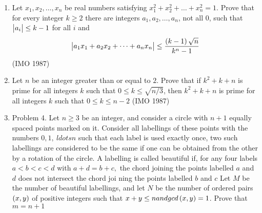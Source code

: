 \begin{enumerate}
\item Let $x_1, x_2, \dots, x_n$ be real numbers satisfying $x^2_1 +x^2_2 +\dots+x^2_n = 1$. Prove that for every integer $k\geq2$ there are integers $a_1, a_2, \dots , a_n$, not all $0$, such that $\begin{vmatrix}a_i\end{vmatrix}\leq k-1$ for all $i$ and 
                     \begin{align*} \begin{vmatrix}a_1x_1+a_2x_2+\dots+a_nx_n\end{vmatrix} \leq \frac{\left(k-1\right)\sqrt{n}}{k^n-1} \end{align*}\hfill(IMO 1987)
	 \item Let $n$ be an integer greater than or equal to $2$. Prove that if $k^2+k+n$ is prime for all integers $k$ such that $0\leq k\leq \sqrt{n/3}$, then $k^2+k+n$ is prime for all integers $k$ such that $0\leq k\leq n-2$ \hfill(IMO 1987)
 \item Problem 4. Let $n \geq  3$ be an integer, and consider a circle with $n+1$ equally spaced points marked on it. Consider all labellings of these points with the numbers $0,1,\    ldots n$ such that each label is used exactly once, two such labellings are considered to be the same if one can be obtained from the other by a rotation of the circle. A labelling     is called beautiful if, for any four labels $a< b<c < d$ with $a+d=b+c,$ the chord joining the points labelled $a$ and $d$ does not intersect the chord joi    ning the points labelled $b$ and $c$                                                                                                                                                                                                                                                                                                                                     Let $M$ be the number of beautiful labellings, and let $N$ be the number of ordered pairs $\left(x, y\right)$ of  positive integers such that $x+y\leq n and gcd \left(x,y\right) = 1$. Prove that                                                                                                                                                                                                                                                                                                                                $m=n+1$  
\end{enumerate}
